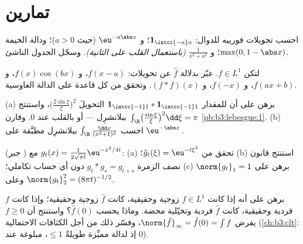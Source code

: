 \section{تمارين}

\begin{exercise}[$\star$]\label{exo:b3:fouriertransform:1}
احسب تحويلات فورييه للدوال: $\mathbf 1_{\intcc{-a}a}$؛ و $\eu^{-a\abs x}$ (حيث
$a > 0$)؛ ودالة الخيمة $\max(0, 1 -
\abs x)$؛ و $\frac1{x^2 + a^2}$ \emph{(باستعمال
القلب على الثانية)}. وسجّل الجدول الناشئ.
\end{exercise}

\begin{exercise}[$\star$]\label{exo:b3:fouriertransform:2}
لتكن $f \in L^1$. عبّر بدلالة $\hat f$ عن تحويلات: $f(x - a)$،
و $f(x)\cos(bx)$، و $f(ax + b)$، و $\overline{f(-x)}$، و $(f * f)(x)$.
وتحقق من كل قاعدة على الدالة الغاوسية.
\end{exercise}

\begin{exercise}[$\star\star$]\label{exo:b3:fouriertransform:3}
(a) برهن على أن للمقدار $\mathbf 1_{\intcc{-1}1} * \mathbf
1_{\intcc{-1}1}$ التحويلَ $\bigl(\frac{2\sin\xi}\xi
\bigr)^2$، واستنتج
$\int_\R\bigl(\frac{\sin\xi}\xi\bigr)^2\dd\xi = \pi$ ببلانشرِل --- أو بالقلب عند $0$. وقارن \cref{pb:b3:lebesgue:1}.
(b) احسب $\int_\R\frac{\dd x}{(x^2+1)^2}$ ببلانشرِل مطبَّقة على $\eu^{-\abs x}$.
\end{exercise}

\begin{exercise}[$\star\star$]\label{exo:b3:fouriertransform:4}
(جبر ) مع $g_t(x) =
\frac1{2\sqrt{\pi t}}\eu^{-x^2/4t}$:
(a) تحقق من $\hat g_t(\xi) = \eu^{-t\xi^2}$؛
(b) استنتج قانون نصف الزمرة $g_t * g_s = g_{t+s}$ دون أي حساب تكاملي؛
(c) برهن على $\norm{g_t}_1 = 1$ وعلى $\norm{g_t}_2^2 =
(8\pi t)^{-1/2}$.
\end{exercise}

\begin{exercise}[$\star\star$]\label{exo:b3:fouriertransform:5}
برهن على أنه إذا كانت $f \in L^1$ زوجية وحقيقية، كانت $\hat f$
زوجية وحقيقية؛ وإذا كانت $f$ فردية وحقيقية، كانت $\hat f$
فردية وتخيّلية محضة. وماذا يحسب $\hat f(0)$؟ واستنتج أن $f \geq
0$
يفرض $\norm{\hat f}_\infty = \hat f(0) = \int f$، وفسّر ذلك من أجل الكثافات الاحتمالية (\cref{ch:b3:clt}:
إذ لدالة مميِّزة طويلةٌ $\leq 1$، مبلوغة عند $0$).
\end{exercise}

